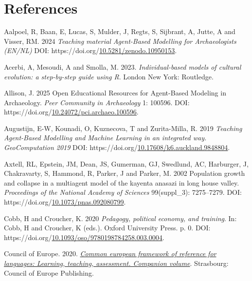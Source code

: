\documentclass[
]{article}
\newlength{\cslhangindent}
\newlength{\cslentryspacingunit} %
\newenvironment{CSLReferences}[2] %
 {%
  \setlength{\parindent}{0pt}
  \ifodd #1
  \let\oldpar\par
  \def\par{\hangindent=\cslhangindent\oldpar}
  \fi
  \setlength{\parskip}{#2\cslentryspacingunit}
 }%
 {}
\begin{document}
\hypertarget{references}{%
\section*{References}\label{references}}

\hypertarget{refs}{}
\begin{CSLReferences}{1}{0}
\leavevmode{}%
Aalpoel, R, Baan, E, Lucas, S, Mulder, J, Regts, S, Sijbrant, A, Jutte, A and Visser, RM. 2024 \emph{Teaching material Agent-Based Modelling for Archaeologists (EN/NL)} DOI: https://doi.org/\href{https://doi.org/10.5281/zenodo.10950153}{10.5281/zenodo.10950153}.

\leavevmode{}%
Acerbi, A, Mesoudi, A and Smolla, M. 2023. \emph{Individual-based models of cultural evolution: a step-by-step guide using R}. London New York: Routledge.

\leavevmode{}%
Allison, J. 2025 Open Educational Resources for Agent-Based Modeling in Archaeology. \emph{Peer Community in Archaeology} 1: 100596. DOI: https://doi.org/\href{https://doi.org/10.24072/pci.archaeo.100596}{10.24072/pci.archaeo.100596}.

\leavevmode{}%
Augustijn, E-W, Kounadi, O, Kuznecova, T and Zurita-Milla, R. 2019 \emph{Teaching Agent-Based Modelling and Machine Learning in an integrated way. GeoComputation 2019} DOI: https://doi.org/\href{https://doi.org/10.17608/k6.auckland.9848804}{10.17608/k6.auckland.9848804}.

\leavevmode{}%
Axtell, RL, Epstein, JM, Dean, JS, Gumerman, GJ, Swedlund, AC, Harburger, J, Chakravarty, S, Hammond, R, Parker, J and Parker, M. 2002 Population growth and collapse in a multiagent model of the kayenta anasazi in long house valley. \emph{Proceedings of the National Academy of Sciences} 99(suppl{\_}3): 7275--7279. DOI: https://doi.org/\href{https://doi.org/10.1073/pnas.092080799}{10.1073/pnas.092080799}.

\leavevmode{}%
Cobb, H and Croucher, K. 2020 \emph{Pedagogy, political economy, and training}. In: Cobb, H and Croucher, K (eds.). Oxford University Press. p. 0. DOI: https://doi.org/\href{https://doi.org/10.1093/oso/9780198784258.003.0004}{10.1093/oso/9780198784258.003.0004}.

\leavevmode{}%
Council of Europe. 2020. \emph{\href{http://www.coe.int/lang-cefr}{Common european framework of reference for languages: Learning, teaching, assessment. Companion volume}}. Strasbourg: Council of Europe Publishing.


\end{CSLReferences}
\end{document}
